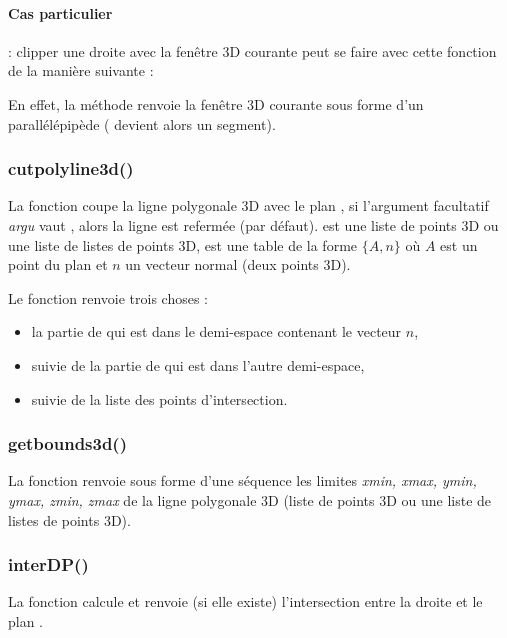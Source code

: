 \paragraph{Cas particulier} : clipper une droite  avec la fenêtre 3D courante peut se faire avec cette fonction de la manière suivante :

En effet, la méthode  renvoie la fenêtre 3D courante sous forme d'un parallélépipède ( devient alors un segment).

\subsubsection{cutpolyline3d()}

La fonction  coupe la ligne polygonale 3D  avec le plan , si l'argument facultatif \emph{argu} vaut \true, alors la ligne est refermée (\false par défaut).  est une liste de points 3D ou une liste de listes de points 3D,  est une table de la forme $\{A,n\}$ où $A$ est un point du plan et $n$ un vecteur normal (deux points 3D).

Le fonction renvoie trois choses :
\begin{itemize}
    \item la partie de  qui est dans le demi-espace contenant le vecteur $n$,
    \item suivie de la partie de  qui est dans l'autre demi-espace,
    \item suivie de la liste des points d'intersection.
\end{itemize}

\subsubsection{getbounds3d()}

La fonction  renvoie sous forme d'une séquence les limites \emph{xmin, xmax, ymin, ymax, zmin, zmax} de la ligne polygonale 3D  (liste de points 3D ou une liste de listes de points 3D).

\subsubsection{interDP()}

La fonction  calcule et renvoie (si elle existe) l'intersection entre la droite  et le plan .

